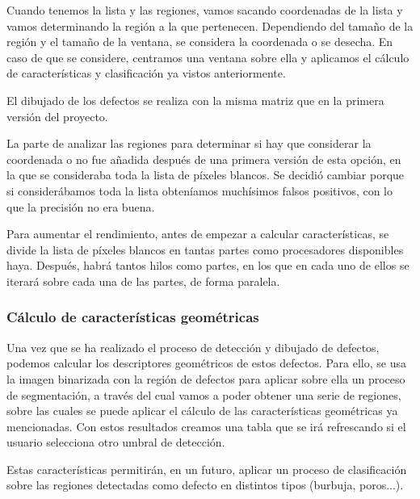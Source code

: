 Cuando tenemos la lista y las regiones, vamos sacando coordenadas de la lista y vamos determinando la región a la que pertenecen. Dependiendo del tamaño de la región y el tamaño de la ventana, se considera la coordenada o se desecha. En caso de que se considere, centramos una ventana sobre ella y aplicamos el cálculo de características y clasificación ya vistos anteriormente.


El dibujado de los defectos se realiza con la misma matriz que en la primera versión del proyecto.

La parte de analizar las regiones para determinar si hay que considerar la coordenada o no fue añadida después de una primera versión de esta opción, en la que se consideraba toda la lista de píxeles blancos. Se decidió cambiar porque si considerábamos toda la lista obteníamos muchísimos falsos positivos, con lo que la precisión no era buena.

Para aumentar el rendimiento, antes de empezar a calcular características, se divide la lista de píxeles blancos en tantas partes como procesadores disponibles haya. Después, habrá tantos hilos como partes, en los que en cada uno de ellos se iterará sobre cada una de las partes, de forma paralela.

\subsubsection{Cálculo de características geométricas}
Una vez que se ha realizado el proceso de detección y dibujado de defectos, podemos calcular los descriptores geométricos de estos defectos. Para ello, se usa la imagen binarizada con la región de defectos para aplicar sobre ella un proceso de segmentación, a través del cual vamos a poder obtener una serie de regiones, sobre las cuales se puede aplicar el cálculo de las características geométricas ya mencionadas. Con estos resultados creamos una tabla que se irá refrescando si el usuario selecciona otro umbral de detección.

Estas características permitirán, en un futuro, aplicar un proceso de clasificación sobre las regiones detectadas como defecto en distintos tipos (burbuja, poros...).

